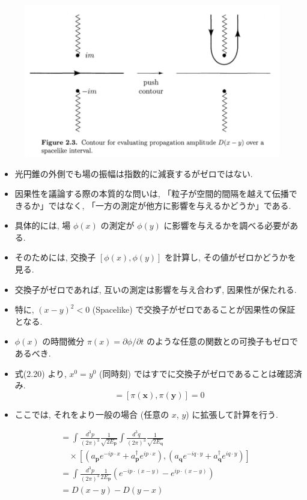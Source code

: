 \documentclass[a4paper,12pt]{article}
\begin{document}
\begin{figure}[H]
    \centering
    \includegraphics[width=1\textwidth]{PeskinQFT_Sec2-4_fig/fig2-3.png}
\end{figure}

\begin{itemize}
  \item 光円錐の外側でも場の振幅は指数的に減衰するがゼロではない.
  \item 因果性を議論する際の本質的な問いは, 「粒子が空間的間隔を越えて伝播できるか」ではなく, 「一方の測定が他方に影響を与えるかどうか」である.
  \item 具体的には, 場 $\phi(x)$ の測定が $\phi(y)$ に影響を与えるかを調べる必要がある.
  \item そのためには, 交換子 $[\phi(x), \phi(y)]$ を計算し, その値がゼロかどうかを見る.
  \item 交換子がゼロであれば, 互いの測定は影響を与え合わず, 因果性が保たれる.
  \item 特に, $(x - y)^2 < 0$ (Spacelike) で交換子がゼロであることが因果性の保証となる.
  \item $\phi(x)$ の時間微分 $\pi(x) = \partial \phi / \partial t$ のような任意の関数との可換子もゼロであるべき.
  \item 式(2.20) より, $x^0 = y^0$ (同時刻) ではすでに交換子がゼロであることは確認済み.
  \begin{equation*}
    [\phi(\mathbf{x}), \phi(\mathbf{y})] = [\pi(\mathbf{x}), \pi(\mathbf{y})] = 0 \tag{2.20}
  \end{equation*}
  \item ここでは, それをより一般の場合 (任意の $x$, $y$) に拡張して計算を行う.
\end{itemize}
\begin{align*}
[\phi(x), \phi(y)] &= \int \frac{d^3 p}{(2\pi)^3} \frac{1}{\sqrt{2E_{\mathbf{p}}}} \int \frac{d^3 q}{(2\pi)^3} \frac{1}{\sqrt{2E_{\mathbf{q}}}} \\
&\quad \times \left[ \left( a_{\mathbf{p}} e^{-ip \cdot x} + a_{\mathbf{p}}^\dagger e^{ip \cdot x} \right), \left( a_{\mathbf{q}} e^{-iq \cdot y} + a_{\mathbf{q}}^\dagger e^{iq \cdot y} \right) \right] \\
&= \int \frac{d^3 p}{(2\pi)^3} \frac{1}{2E_{\mathbf{p}}} \left( e^{-ip \cdot (x - y)} - e^{ip \cdot (x - y)} \right) \\
&= D(x - y) - D(y - x) \label{2.53}\tag{2.53}
\end{align*}
\end{document}
